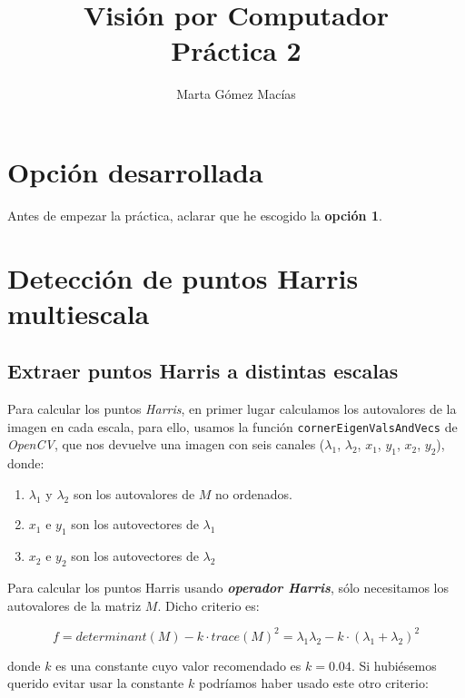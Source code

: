 \documentclass[11pt,a4paper]{article}
\title{\Huge{Visión por Computador} \\ Práctica 2}
\author{Marta Gómez Macías}
\theoremstyle{plain}
\theoremstyle{definition}
\begin{document}
\maketitle

\tableofcontents

\setcounter{section}{-1}
\section{Opción desarrollada}

Antes de empezar la práctica, aclarar que he escogido la \textbf{opción 1}.

\section{Detección de puntos Harris multiescala}

\subsection{Extraer puntos Harris a distintas escalas}

Para calcular los puntos \textit{Harris}, en primer lugar calculamos los autovalores de la imagen en cada escala, para ello, usamos la función \texttt{cornerEigenValsAndVecs} de \textit{OpenCV}, que nos devuelve una imagen con seis canales ($\lambda_1$, $\lambda_2$, $x_1$, $y_1$, $x_2$, $y_2$), donde:

\begin{enumerate}[$\bullet$]
\item $\lambda_1$ y $\lambda_2$ son los autovalores de $M$ no ordenados.

\item $x_1$ e $y_1$ son los autovectores de $\lambda_1$

\item $x_2$ e $y_2$ son los autovectores de $\lambda_2$
\end{enumerate}

Para calcular los puntos Harris usando \textit{\textbf{operador Harris}}, sólo necesitamos los autovalores de la matriz $M$. Dicho criterio es:

\begin{displaymath}
    f = determinant(M) - k \cdot trace(M)^2 = \lambda_1 \lambda_2 - k \cdot (\lambda_1 + \lambda_2)^2
\end{displaymath}

donde $k$ es una constante cuyo valor recomendado es $k = 0.04$. Si hubiésemos querido evitar usar la constante $k$ podríamos haber usado este otro criterio:
\end{document}
